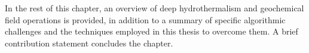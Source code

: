 In the rest of this chapter, an overview of deep hydrothermalism and geochemical field operations is provided, in addition to a summary of specific algorithmic challenges and the techniques employed in this thesis to overcome them.
A brief contribution statement concludes the chapter.










